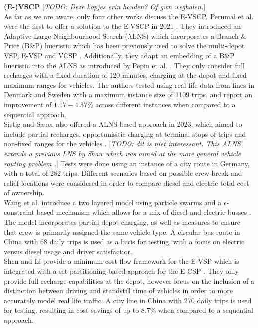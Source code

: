 \documentclass[]{article}
\newcommand{\todo}[1]{{\color{red}[\textit{TODO: #1}]}}
\begin{document}
\noindent \textbf{(E-)VSCP} \todo{Deze kopjes erin houden? Of gwn weghalen.} \\

As far as we are aware, only four other works discuss the E-VSCP. Perumal et al. were the first to offer a solution to the E-VSCP in 2021 \cite{PERUMAL2021105268}. They introduced an Adaptive Large Neighbourhood Search (ALNS) which incorporates a Branch \& Price (B\&P) hueristic which has been previously used to solve the multi-depot VSP, E-VSP and VCSP \cite{Pepin2009, Haase1996, vanKootenNiekerk2017}. Additionally, they adapt an embedding of a B\&P hueristic into the ALNS as introduced by Pepin et al. \cite{Pepin2009}. They only consider full recharges with a fixed duration of 120 minutes, charging at the depot and fixed maximum ranges for vehicles. The authors tested using real life data from lines in Denmark and Sweden with a maximum instance size of 1109 trips, and report an improvement of $1.17-4.37\%$ across different instances when compared to a sequential approach. \\
Sistig and Sauer also offered a ALNS based approach in 2023, which aimed to include partial recharges, opportunisitic charging at terminal stops of trips and non-fixed ranges for the vehicles \cite{SISTIG2023120915}. \todo{dit is niet interessant. This ALNS extends a previous LNS by Shaw which was aimed at the more general vehicle routing problem \cite{Shaw1997ANL, Shaw1998ANL}.} Tests were done using an instance of a city route in Germany, with a total of 282 trips. Different scenarios based on possible crew break and relief locations were considered in order to compare diesel and electric total cost of ownership. \\
Wang et al. introduce a two layered model using particle swarms and a $\epsilon$-constraint based mechanism which allows for a mix of diesel and electric busses \cite{su14063627}. The model incorporates partial depot charging, as well as measures to ensure that crew is primarily assigned the same vehicle type. A circular bus route in China with 68 daily trips is used as a basis for testing, with a focus on electric versus diesel usage and driver satisfaction. \\
Shen and Li provide a minimum-cost flow framework for the E-VSP which is integrated with a set partitioning based approach for the E-CSP \cite{SHEN2023}. They only provide full recharge capabilities at the depot, however focus on the inclusion of a distinction between driving and standstill time of vehicles in order to more accurately model real life traffic. A city line in China with 270 daily trips is used for testing, resulting in cost savings of up to 8.7\% when compared to a sequential approach.
\end{document}
